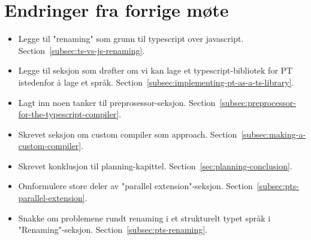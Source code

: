 
\chapter*{Endringer fra forrige møte}

\begin{itemize}
    \item Legge til "renaming" som grunn til typescript over javascript.
    Section~\vref{subsec:ts-vs-js-renaming}.
    \item Legge til seksjon som drøfter om vi kan lage et typescript-bibliotek for PT istedenfor å lage et språk.
    Section~\vref{subsec:implementing-pt-as-a-ts-library}.
    \item Lagt inn noen tanker til preprosessor-seksjon.
    Section~\vref{subsec:preprocessor-for-the-typescript-compiler}.
    \item Skrevet seksjon om custom compiler som approach.
    Section~\vref{subsec:making-a-custom-compiler}.
    \item Skrevet konklusjon til planning-kapittel.
    Section~\vref{sec:planning-conclusion}.
    \item Omformulere store deler av "parallel extension"-seksjon.
    Section~\vref{subsec:pts-parallel-extension}.
    \item Snakke om problemene rundt renaming i et strukturelt typet språk i "Renaming"-seksjon.
    Section~\vref{subsec:pts-renaming}.
\end{itemize}

